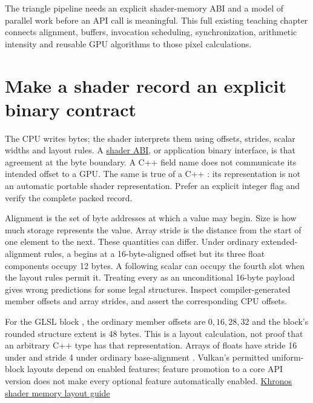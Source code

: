 The triangle pipeline needs an explicit shader-memory ABI and a model of parallel work before an API call is meaningful. This full existing teaching chapter connects alignment, buffers, invocation scheduling, synchronization, arithmetic intensity and reusable GPU algorithms to those pixel calculations.

\section{Make a shader record an explicit binary contract}\label{03-visual-computing-i-ch015-make-a-shader-record-an-explicit-binary-contract}

\hypertarget{03-visual-computing-i-ch015-make-a-shader-record-an-explicit-binary-contract}{}

The CPU writes bytes; the shader interprets them using offsets, strides, scalar widths and layout rules. A \hyperref[appendix-749048795dbb]{shader ABI}, or application binary interface, is that agreement at the byte boundary. A C++ field name does not communicate its intended offset to a GPU. The same is true of a C++ : its representation is not an automatic portable shader representation. Prefer an explicit integer flag and verify the complete packed record.

Alignment is the set of byte addresses at which a value may begin. Size is how much storage represents the value. Array stride is the distance from the start of one element to the next. These quantities can differ. Under ordinary extended-alignment  rules, a  begins at a 16-byte-aligned offset but its three float components occupy 12 bytes. A following scalar can occupy the fourth slot when the layout rules permit it. Treating every  as an unconditional 16-byte payload gives wrong predictions for some legal structures. Inspect compiler-generated member offsets and array strides, and assert the corresponding CPU offsets.

For the GLSL block , the ordinary member offsets are \(0,16,28,32\) and the block's rounded structure extent is 48 bytes. This is a layout calculation, not proof that an arbitrary C++ type has that representation. Arrays of floats have stride 16 under  and stride 4 under ordinary base-alignment . Vulkan's permitted uniform-block layouts depend on enabled features; feature promotion to a core API version does not make every optional feature automatically enabled. \href{https://docs.vulkan.org/guide/latest/shader_memory_layout.html}{Khronos shader memory layout guide}

